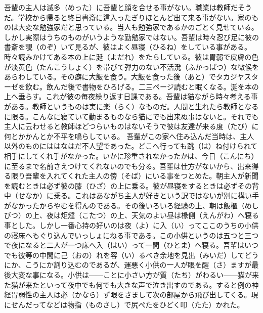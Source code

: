 \documentclass{book}
\begin{document}
吾輩の主人は滅多（めった）に吾輩と顔を合せる事がない。職業は教師だそうだ。学校から帰ると終日書斎に這入ったぎりほとんど出て来る事がない。家のものは大変な勉強家だと思っている。当人も勉強家であるかのごとく見せている。しかし実際はうちのものがいうような勤勉家ではない。吾輩は時々忍び足に彼の書斎を覗（のぞ）いて見るが、彼はよく昼寝（ひるね）をしている事がある。時々読みかけてある本の上に涎（よだれ）をたらしている。彼は胃弱で皮膚の色が淡黄色（たんこうしょく）を帯びて弾力のない不活溌（ふかっぱつ）な徴候をあらわしている。その癖に大飯を食う。大飯を食った後（あと）でタカジヤスターゼを飲む。飲んだ後で書物をひろげる。二三ページ読むと眠くなる。涎を本の上へ垂らす。これが彼の毎夜繰り返す日課である。吾輩は猫ながら時々考える事がある。教師というものは実に楽（らく）なものだ。人間と生れたら教師となるに限る。こんなに寝ていて勤まるものなら猫にでも出来ぬ事はないと。それでも主人に云わせると教師ほどつらいものはないそうで彼は友達が来る度（たび）に何とかかんとか不平を鳴らしている。
吾輩がこの家へ住み込んだ当時は、主人以外のものにははなはだ不人望であった。どこへ行っても跳（は）ね付けられて相手にしてくれ手がなかった。いかに珍重されなかったかは、今日（こんにち）に至るまで名前さえつけてくれないのでも分る。吾輩は仕方がないから、出来得る限り吾輩を入れてくれた主人の傍（そば）にいる事をつとめた。朝主人が新聞を読むときは必ず彼の膝（ひざ）の上に乗る。彼が昼寝をするときは必ずその背中（せなか）に乗る。これはあながち主人が好きという訳ではないが別に構い手がなかったからやむを得んのである。その後いろいろ経験の上、朝は飯櫃（めしびつ）の上、夜は炬燵（こたつ）の上、天気のよい昼は椽側（えんがわ）へ寝る事とした。しかし一番心持の好いのは夜（よ）に入（い）ってここのうちの小供の寝床へもぐり込んでいっしょにねる事である。この小供というのは五つと三つで夜になると二人が一つ床へ入（はい）って一間（ひとま）へ寝る。吾輩はいつでも彼等の中間に己（おの）れを容（い）るべき余地を見出（みいだ）してどうにか、こうにか割り込むのであるが、運悪く小供の一人が眼を醒（さ）ますが最後大変な事になる。小供は――ことに小さい方が質（たち）がわるい――猫が来た猫が来たといって夜中でも何でも大きな声で泣き出すのである。すると例の神経胃弱性の主人は必（かなら）ず眼をさまして次の部屋から飛び出してくる。現にせんだってなどは物指（ものさし）で尻ぺたをひどく叩（たた）かれた。
\end{document}
